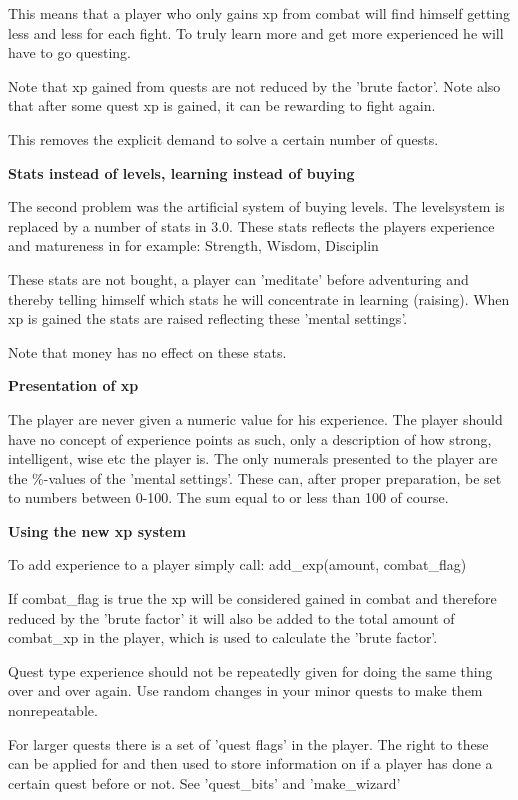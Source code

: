 This means that a player who only gains xp from combat will find himself
getting less and less for each fight. To truly learn more and get more
experienced he will have to go questing. 

Note that xp gained from quests are not reduced by the 'brute factor'. Note
also that after some quest xp is gained, it can be rewarding to fight again.

This removes the explicit demand to solve a certain number of quests. 

{\bf Stats instead of levels, learning instead of buying}


The second problem was the artificial system of buying levels. The levelsystem
is replaced by a number of stats in 3.0. These stats reflects the players
experience and matureness in for example: Strength, Wisdom, Disciplin

These stats are not bought, a player can 'meditate' before adventuring and 
thereby telling himself which stats he will concentrate in learning (raising).
When xp is gained the stats are raised reflecting these 'mental settings'.

Note that money has no effect on these stats.

{\bf Presentation of xp}


The player are never given a numeric value for his experience. The player
should have no concept of experience points as such, only a description of
how strong, intelligent, wise etc the player is. The only numerals presented
to the player are the \%-values of the 'mental settings'. These can, after
proper preparation, be set to numbers between 0-100. The sum equal to or less
than 100 of course.

{\bf Using the new xp system}


To add experience to a player simply call: add\_exp(amount, combat\_flag)

If combat\_flag is true the xp will be considered gained in combat and therefore
reduced by the 'brute factor' it will also be added to the total amount of
combat\_xp in the player, which is used to calculate the 'brute factor'.

Quest type experience should not be repeatedly given for doing the same thing
over and over again. Use random changes in your minor quests to make them
nonrepeatable.

For larger quests there is a set of 'quest flags' in the player. The right to
these can be applied for and then used to store information on if a player has
done a certain quest before or not. See 'quest\_bits' and 'make\_wizard'

